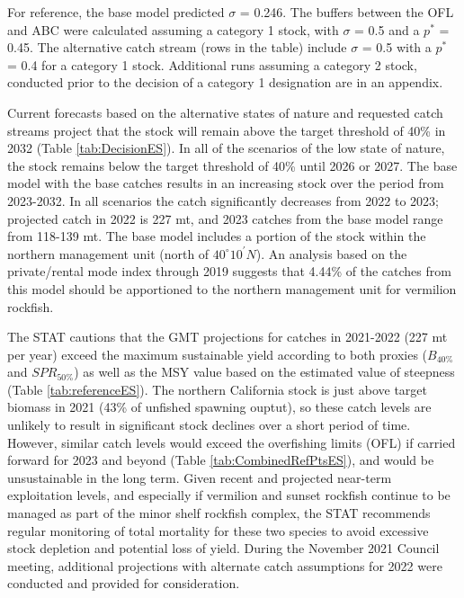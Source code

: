 \documentclass[11pt,
  english,
]{article}
\begin{document}
For reference, the base model predicted {\(\sigma\)\leavevmode\tagmcend\tagstructend} = 0.246. The buffers between the OFL and ABC were calculated assuming a category 1 stock, with {\(\sigma\)\leavevmode\tagmcend\tagstructend} = 0.5 and a {\(p^*\)\leavevmode\tagmcend\tagstructend} = 0.45. The alternative catch stream (rows in the table) include {\(\sigma\)\leavevmode\tagmcend\tagstructend} = 0.5 with a {\(p^*\)\leavevmode\tagmcend\tagstructend} = 0.4 for a category 1 stock. Additional runs assuming a category 2 stock, conducted prior to the decision of a category 1 designation are in an appendix.

Current forecasts based on the alternative states of nature and requested catch streams project that the stock will remain above the target threshold of 40\% in 2032 (Table \ref{tab:DecisionES}). In all of the scenarios of the low state of nature, the stock remains below the target threshold of 40\% until 2026 or 2027. The base model with the base catches results in an increasing stock over the period from 2023-2032. In all scenarios the catch significantly decreases from 2022 to 2023; projected catch in 2022 is 227 mt, and 2023 catches from the base model range from 118-139 mt. The base model includes a portion of the stock within the northern management unit (north of $40^\circ 10^\prime N$). An analysis based on the private/rental mode index through 2019 suggests that 4.44\% of the catches from this model should be apportioned to the northern management unit for vermilion rockfish.

The STAT cautions that the GMT projections for catches in 2021-2022 (227 mt per year) exceed the maximum sustainable yield according to both proxies ({\(B_{40\%}\)\leavevmode\tagmcend\tagstructend} and {\(SPR_{50\%}\)\leavevmode\tagmcend\tagstructend}) as well as the MSY value based on the estimated value of steepness (Table \ref{tab:referenceES}). The northern California stock is just above target biomass in 2021 (43\% of unfished spawning ouptut), so these catch levels are unlikely to result in significant stock declines over a short period of time. However, similar catch levels would exceed the overfishing limits (OFL) if carried forward for 2023 and beyond (Table \ref{tab:CombinedRefPtsES}), and would be unsustainable in the long term. Given recent and projected near-term exploitation levels, and especially if vermilion and sunset rockfish continue to be managed as part of the minor shelf rockfish complex, the STAT recommends regular monitoring of total mortality for these two species to avoid excessive stock depletion and potential loss of yield. During the November 2021 Council meeting, additional projections with alternate catch assumptions for 2022 were conducted and provided for consideration.
\end{document}
